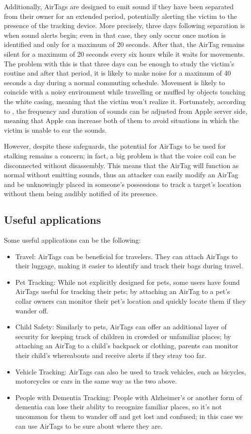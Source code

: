 \documentclass[english]{article}
\begin{document}
Additionally, AirTags are designed to emit sound if they have been separated from their owner for an extended period, potentially alerting the victim to the presence of the tracking device. More precisely, three days following separation is when sound alerts begin; even in that case, they only occur once motion is identified and only for a maximum of 20 seconds. After that, the AirTag remains silent for a maximum of 20 seconds every six hours while it waits for movements. The problem with this is that three days can be enough to study the victim's routine and after that period, it is likely to make noise for a maximum of 40 seconds a day during a normal commuting schedule. Movement is likely to coincide with a noisy environment while travelling or muffled by objects touching the white casing, meaning that the victim won't realize it. Fortunately, according to \cite{server}, the frequency and duration of sounds can be adjusted from Apple server side, meaning that Apple can increase both of them to avoid situations in which the victim is unable to ear the sounds.

However, despite these safeguards, the potential for AirTags to be used for stalking remains a concern; in fact, a big problem is that the voice coil can be disconnected without disassembly. This means that the AirTag will function as normal without emitting sounds, thus an attacker can easily modify an AirTag and be unknowingly placed in someone’s possessions to track a target’s location without them being audibly notified of its presence.
\subsection{Useful applications}
Some useful applications can be the following:
\begin{itemize}
  \item Travel: AirTags can be beneficial for travelers. They can attach AirTags to their luggage, making it easier to identify and track their bags during travel. 
  \item Pet Tracking: While not explicitly designed for pets, some users have found AirTags useful for tracking their pets; by attaching an AirTag to a pet's collar owners can monitor their pet's location and quickly locate them if they wander off.
  \item Child Safety: Similarly to pets, AirTags can offer an additional layer of security for keeping track of children in crowded or unfamiliar places; by attaching an AirTag to a child's backpack or clothing, parents can monitor their child's whereabouts and receive alerts if they stray too far.
  \item Vehicle Tracking: AirTags can also be used to track vehicles, such as bicycles, motorcycles or cars in the same way as the two above.
  \item People with Dementia Tracking: People with Alzheimer's or another form of dementia can lose their ability to recognize familiar places, so it's not uncommon for them to wander off and get lost and confused; in this case we can use AirTags to be sure about where they are.
\end{itemize}
\end{document}
